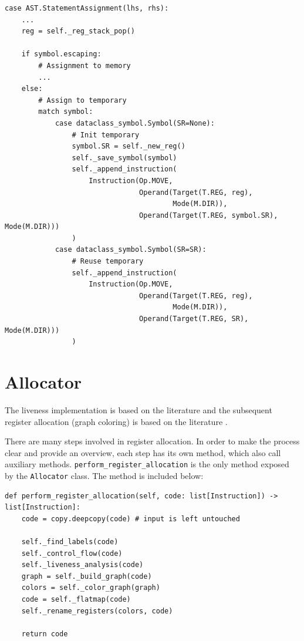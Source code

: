 \begin{verbatim}
case AST.StatementAssignment(lhs, rhs):
    ...
    reg = self._reg_stack_pop()

    if symbol.escaping:
        # Assignment to memory
        ...
    else:
        # Assign to temporary
        match symbol:
            case dataclass_symbol.Symbol(SR=None):
                # Init temporary
                symbol.SR = self._new_reg()
                self._save_symbol(symbol)
                self._append_instruction(
                    Instruction(Op.MOVE,
                                Operand(Target(T.REG, reg),
                                        Mode(M.DIR)),
                                Operand(Target(T.REG, symbol.SR), Mode(M.DIR)))
                )
            case dataclass_symbol.Symbol(SR=SR):
                # Reuse temporary
                self._append_instruction(
                    Instruction(Op.MOVE,
                                Operand(Target(T.REG, reg),
                                        Mode(M.DIR)),
                                Operand(Target(T.REG, SR), Mode(M.DIR)))
                )
\end{verbatim}

\section{Allocator}
The liveness implementation is based on the literature \cite[218-223]{ModernCompilerImplementation} and the subsequent register allocation (graph coloring) is based on the literature \cite[235-238]{ModernCompilerImplementation}. 

There are many steps involved in register allocation. In order to make the process clear and provide an overview, each step has its own method, which also call auxiliary methods. \texttt{perform\_register\_allocation} is the only method exposed by the \texttt{Allocator} class. The method is included below:

\begin{verbatim}
def perform_register_allocation(self, code: list[Instruction]) -> list[Instruction]:
    code = copy.deepcopy(code) # input is left untouched

    self._find_labels(code)
    self._control_flow(code)
    self._liveness_analysis(code)
    graph = self._build_graph(code)
    colors = self._color_graph(graph)
    code = self._flatmap(code)
    self._rename_registers(colors, code)

    return code
\end{verbatim}


